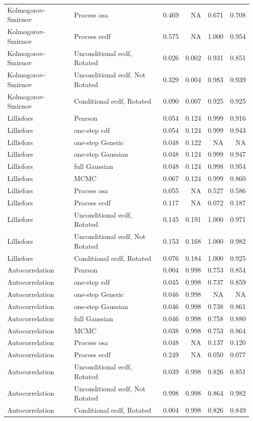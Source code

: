 \documentclass[
]{article}
\begin{document}
\begin{table}[H]
\begin{tabular}[t]{llrrrr}
Kolmogorov- Smirnov & Process osa & 0.469 & NA & 0.671 & 0.708\\
Kolmogorov- Smirnov & Process ecdf & 0.575 & NA & 1.000 & 0.954\\
Kolmogorov- Smirnov & Unconditional ecdf, Rotated & 0.026 & 0.002 & 0.931 & 0.851\\
\addlinespace
Kolmogorov- Smirnov & Unconditional ecdf, Not Rotated & 0.329 & 0.004 & 0.983 & 0.939\\
Kolmogorov- Smirnov & Conditional ecdf, Rotated & 0.090 & 0.007 & 0.925 & 0.925\\
Lilliefors & Pearson & 0.054 & 0.124 & 0.999 & 0.916\\
Lilliefors & one-step cdf & 0.054 & 0.124 & 0.999 & 0.943\\
Lilliefors & one-step Generic & 0.048 & 0.122 & NA & NA\\
\addlinespace
Lilliefors & one-step Gaussian & 0.048 & 0.124 & 0.999 & 0.947\\
Lilliefors & full Gaussian & 0.048 & 0.124 & 0.998 & 0.954\\
Lilliefors & MCMC & 0.067 & 0.124 & 0.999 & 0.860\\
Lilliefors & Process osa & 0.055 & NA & 0.527 & 0.586\\
Lilliefors & Process ecdf & 0.117 & NA & 0.072 & 0.187\\
\addlinespace
Lilliefors & Unconditional ecdf, Rotated & 0.145 & 0.191 & 1.000 & 0.971\\
Lilliefors & Unconditional ecdf, Not Rotated & 0.153 & 0.168 & 1.000 & 0.982\\
Lilliefors & Conditional ecdf, Rotated & 0.076 & 0.184 & 1.000 & 0.925\\
Autocorrelation & Pearson & 0.004 & 0.998 & 0.753 & 0.854\\
Autocorrelation & one-step cdf & 0.045 & 0.998 & 0.737 & 0.859\\
\addlinespace
Autocorrelation & one-step Generic & 0.046 & 0.998 & NA & NA\\
Autocorrelation & one-step Gaussian & 0.046 & 0.998 & 0.738 & 0.861\\
Autocorrelation & full Gaussian & 0.046 & 0.998 & 0.758 & 0.880\\
Autocorrelation & MCMC & 0.038 & 0.998 & 0.753 & 0.864\\
Autocorrelation & Process osa & 0.048 & NA & 0.137 & 0.120\\
\addlinespace
Autocorrelation & Process ecdf & 0.249 & NA & 0.050 & 0.077\\
Autocorrelation & Unconditional ecdf, Rotated & 0.039 & 0.998 & 0.826 & 0.851\\
Autocorrelation & Unconditional ecdf, Not Rotated & 0.998 & 0.998 & 0.864 & 0.982\\
Autocorrelation & Conditional ecdf, Rotated & 0.004 & 0.998 & 0.826 & 0.849\\
\bottomrule
\end{tabular}
\end{table}
\end{document}

